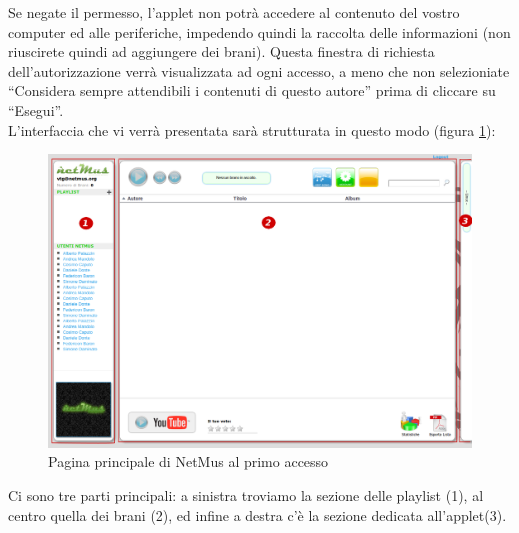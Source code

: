 Se negate il permesso, l'applet non potr\`a accedere al contenuto del vostro
computer ed alle periferiche, impedendo quindi la raccolta delle informazioni
(non riuscirete quindi ad aggiungere dei brani).
Questa finestra di richiesta dell'autorizzazione verr\`a visualizzata ad ogni
accesso, a meno che non selezioniate ``Considera sempre attendibili i contenuti
di questo autore'' prima di cliccare su ``Esegui''.\\

L'interfaccia che vi verr\`a presentata sar\`a strutturata
in questo modo (figura \ref{fig:paginaPrincipale}):\\

\begin{figure}[!htbp]
  \centering
  \includegraphics[width=14cm]{img/MU/profile_blank.png}
\caption{Pagina principale di NetMus al primo accesso}
\label{fig:paginaPrincipale}
\end{figure}

Ci sono tre parti principali: a sinistra troviamo la sezione delle
playlist (1), al centro quella dei brani (2), ed infine a destra c'\`e la
sezione dedicata all'applet(3).\\

